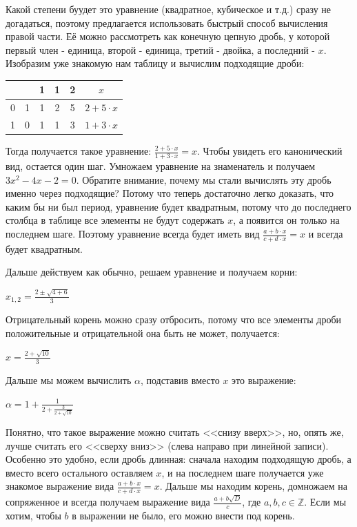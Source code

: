 \documentclass[russian]{lecture-notes}
\begin{document}
\begin{example*}
		Какой степени буудет это уравнение (квадратное, кубическое и т.д.) сразу не догадаться, поэтому предлагается использовать быстрый способ вычисления правой части. Её можно рассмотреть как конечную цепную дробь, у которой первый член - единица, второй - единица, третий - двойка, а последний - $x$. Изобразим уже знакомую нам таблицу и вычислим подходящие дроби:
		
		\begin{center}
			\begin{tabular}{|c|c|c|c|c|c|}
				\hline
				& & 1 & 1 & 2 & $x$\\\hline
				0 & 1 & 1 & 2 & 5 & $2+5\cdot x$\\\hline
				1 & 0 & 1 & 1 & 3 & $1+3\cdot x$ \\\hline
			\end{tabular}
		\end{center}
		
		Тогда получается такое уравнение: $\frac{2+5\cdot x}{1+3\cdot x}=x$. Чтобы увидеть его канонический вид, остается один шаг. Умножаем уравнение на знаменатель и получаем $3x^2-4x-2=0$. Обратите внимание, почему мы стали вычислять эту дробь именно через подходящие? Потому что теперь достаточно легко доказать, что каким бы ни был период,  уравнение будет квадратным, потому что до последнего столбца в таблице все элементы не будут содержать $x$, а появится он только на последнем шаге. Поэтому уравнение всегда будет иметь вид $\frac{a+b\cdot x}{c+d\cdot x}=x$ и всегда будет квадратным.
		
		Дальше действуем как обычно, решаем уравнение и получаем корни:
		\begin{center}
			$x_{1,2}=\frac{2\pm \sqrt{4+6}}{3}$
		\end{center} 
	
		Отрицательный корень можно сразу отбросить, потому что все элементы дроби положительные и отрицательной она быть не может, получается:
		\begin{center}
			$x=\frac{2+\sqrt{10}}{3}$
		\end{center} 
		
		Дальше мы можем вычислить $\alpha$, подставив вместо $x$ это выражение: \begin{center}
			$\alpha=1+\frac{1}{2+\frac{3}{2+\sqrt{10}}}$
		\end{center} 
		
		\begin{remark}
			Понятно, что такое выражение можно считать <<снизу вверх>>, но, опять же, лучше считать его <<сверху вниз>> (слева направо при линейной записи). Особенно это удобно, если дробь длинная: сначала находим подходящую дробь, а вместо всего остального оставляем $x$, и на последнем шаге получается уже знакомое выражение вида $\frac{a+b\cdot x}{c+d\cdot x}=x$. Дальше мы находим корень, домножаем на сопряженное и всегда получаем выражение вида $\frac{a+b\sqrt{D}}{c}$, где $a, b, c \in \mathbb{Z}$. Если мы хотим, чтобы $b$ в выражении не было, его можно внести под корень.
		\end{remark}
	\end{example*}
\end{document}
